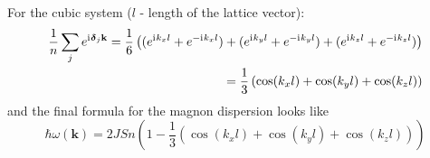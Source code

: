 For the cubic system ($l$ - length of the lattice vector):
\begin{align}
    \dfrac{1}{n}\sum_j
    e^{\mathrm{i}\mkern1mu\boldsymbol{\delta}_j\mathbf{k}}  = \dfrac{1}{6}\left((e^{\mathrm{i}\mkern1mu k_x l} + e^{-\mathrm{i}\mkern1mu k_x l}) + 
    (e^{\mathrm{i}\mkern1mu k_y l} + e^{-\mathrm{i}\mkern1mu k_y l}) +
    (e^{\mathrm{i}\mkern1mu k_z l} + e^{-\mathrm{i}\mkern1mu k_z l})\right) \\
    = \dfrac{1}{3}\left(\cos(k_x l) + \cos(k_y l) + \cos(k_z l)\right)
\end{align}
and the final formula for the magnon dispersion looks like
\begin{equation}
    \hbar\omega(\mathbf{k}) = 2JSn\left(1 - 
    \dfrac{1}{3}\left(\cos(k_x l) + \cos(k_y l) + \cos(k_z l)\right)\right)
\end{equation}